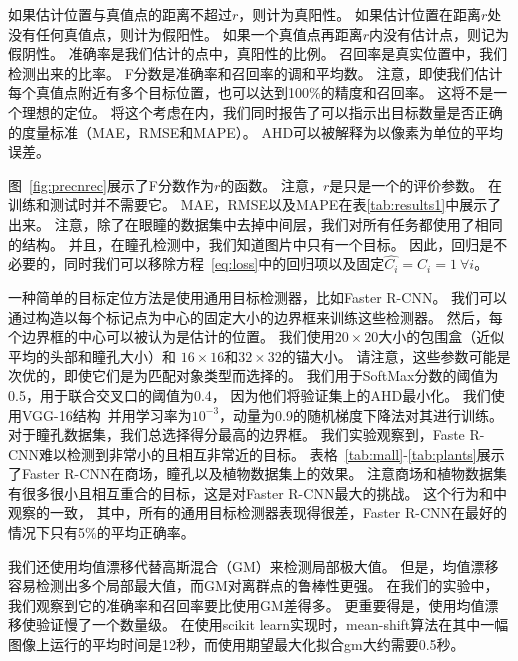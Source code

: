 \documentclass[10pt,twocolumn,letterpaper,UTF8]{article}
\begin{document}
如果估计位置与真值点的距离不超过$r$，则计为真阳性。
如果估计位置在距离$r$处没有任何真值点，则计为假阳性。
如果一个真值点再距离$r$内没有估计点，则记为假阴性。
准确率是我们估计的点中，真阳性的比例。
召回率是真实位置中，我们检测出来的比率。
F分数是准确率和召回率的调和平均数。
注意，即使我们估计每个真值点附近有多个目标位置，也可以达到100\%的精度和召回率。
这将不是一个理想的定位。
将这个考虑在内，我们同时报告了可以指示出目标数量是否正确的度量标准（MAE，RMSE和MAPE）。
AHD可以被解释为以像素为单位的平均误差。

图~\ref{fig:precnrec}展示了F分数作为$r$的函数。
注意，$r$是只是一个的评价参数。
在训练和测试时并不需要它。
MAE，RMSE以及MAPE在表\ref{tab:results1}中展示了出来。
注意，除了在眼瞳的数据集中去掉中间层，我们对所有任务都使用了相同的结构。
并且，在瞳孔检测中，我们知道图片中只有一个目标。
因此，回归是不必要的，同时我们可以移除方程~\eqref{eq:loss}中的回归项以及固定$\hat{C_i} = C_i = 1 ~ \forall i$。

一种简单的目标定位方法是使用通用目标检测器，比如Faster R-CNN\cite{fasterrcnn}。
我们可以通过构造以每个标记点为中心的固定大小的边界框来训练这些检测器。
然后，每个边界框的中心可以被认为是估计的位置。
我们使用$20 \times 20$大小的包围盒（近似平均的头部和瞳孔大小）和 $16\times 16$和$32 \times 32$的锚大小。
请注意，这些参数可能是次优的，即使它们是为匹配对象类型而选择的。
我们用于SoftMax分数的阈值为0.5，用于联合交叉口的阈值为0.4，
因为他们将验证集上的AHD最小化。
我们使用VGG-16结构~\cite{vgg}并用学习率为$10^{-3}$，动量为0.9的随机梯度下降法对其进行训练。
对于瞳孔数据集，我们总选择得分最高的边界框。
我们实验观察到，Faste R-CNN难以检测到非常小的且相互非常近的目标。
表格~\ref{tab:mall}-\ref{tab:plants}展示了Faster R-CNN在商场，瞳孔以及植物数据集上的效果。
注意商场和植物数据集有很多很小且相互重合的目标，这是对Faster R-CNN最大的挑战。
这个行为和\cite{huang2017}中观察的一致，
其中，所有的通用目标检测器表现得很差，Faster R-CNN在最好的情况下只有5\%的平均正确率。

我们还使用均值漂移\cite{meanshift}代替高斯混合（GM）来检测局部极大值。
但是，均值漂移容易检测出多个局部最大值，而GM对离群点的鲁棒性更强。
在我们的实验中，我们观察到它的准确率和召回率要比使用GM差得多。
更重要得是，使用均值漂移使验证慢了一个数量级。
在使用scikit learn实现时，mean-shift算法在其中一幅图像上运行的平均时间是12秒，而使用期望最大化拟合gm大约需要0.5秒。
\end{document}
